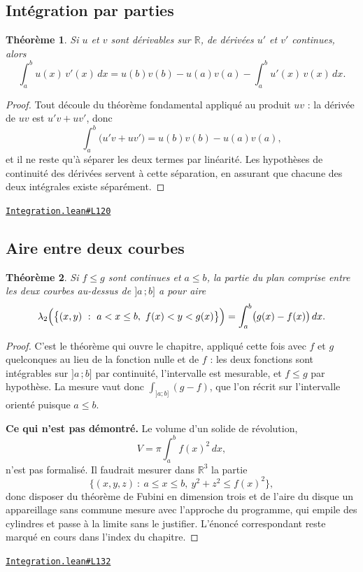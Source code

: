 \documentclass[11pt,a4paper]{article}
\theoremstyle{definition}
\theoremstyle{plain}
\newtheorem{theoreme}{Théorème}
\newcommand{\source}[2]{\par\smallskip\noindent\hfill{\footnotesize\href{#1}{\texttt{#2}}}\par\smallskip}
\begin{document}
\subsection{Intégration par parties}

\begin{theoreme}
Si $u$ et $v$ sont dérivables sur $\mathbb{R}$, de dérivées $u'$ et $v'$ continues, alors
\[ \int_a^b u(x)\,v'(x)\,dx
   = u(b)v(b) - u(a)v(a) - \int_a^b u'(x)\,v(x)\,dx . \]
\end{theoreme}

\begin{proof}
Tout découle du théorème fondamental appliqué au produit $uv$ : la dérivée de $uv$ est $u'v + uv'$, donc
\[ \int_a^b \bigl(u'v + uv'\bigr) = u(b)v(b) - u(a)v(a) , \]
et il ne reste qu'à séparer les deux termes par linéarité. Les hypothèses de continuité
des dérivées servent à cette séparation, en assurant que chacune des deux intégrales
existe séparément.
\end{proof}
\source{https://github.com/Commutator-IO/learn-lean/blob/main/courses/02-lycee/06-integration/Integration.lean\#L120}{Integration.lean\#L120}

\subsection{Aire entre deux courbes}

\begin{theoreme}
Si $f \le g$ sont continues et $a \le b$, la partie du plan comprise entre les deux
courbes au-dessus de $]a\,;b]$ a pour aire
\[ \lambda_2\Bigl(\bigl\{(x, y) \ :\ a < x \le b,\ f(x) < y < g(x)\bigr\}\Bigr)
   = \int_a^b \bigl(g(x) - f(x)\bigr)\,dx . \]
\end{theoreme}

\begin{proof}
C'est le théorème qui ouvre le chapitre, appliqué cette fois avec $f$ et $g$ quelconques
au lieu de la fonction nulle et de $f$ : les deux fonctions sont intégrables sur
$]a\,;b]$ par continuité, l'intervalle est mesurable, et $f \le g$ par hypothèse. La
mesure vaut donc $\int_{]a;b]} (g - f)$, que l'on récrit sur l'intervalle orienté puisque
$a \le b$.

\medskip\noindent
\textbf{Ce qui n'est pas démontré.} Le volume d'un solide de révolution,
\[ V = \pi \int_a^b f(x)^{2}\,dx , \]
n'est pas formalisé. Il faudrait mesurer dans $\mathbb{R}^{3}$ la partie
\[ \bigl\{(x, y, z) \ :\ a \le x \le b,\ y^{2} + z^{2} \le f(x)^{2}\bigr\} , \]
donc disposer du théorème de Fubini en dimension trois et de l'aire du disque \textemdash{}
un appareillage sans commune mesure avec l'approche du programme, qui empile des cylindres
et passe à la limite sans le justifier. L'énoncé correspondant reste marqué
\og{} en cours \fg{} dans l'index du chapitre.
\end{proof}
\source{https://github.com/Commutator-IO/learn-lean/blob/main/courses/02-lycee/06-integration/Integration.lean\#L132}{Integration.lean\#L132}
\end{document}
